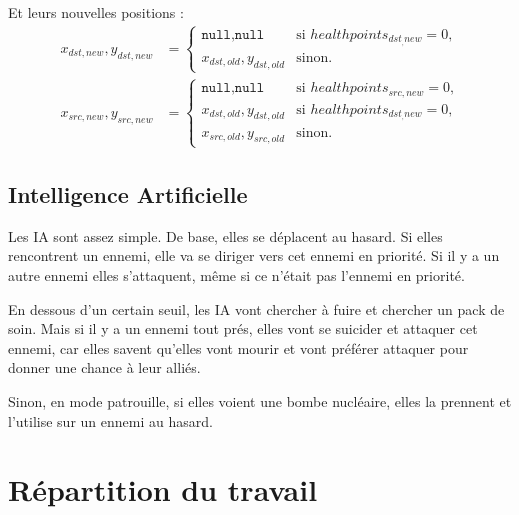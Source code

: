 \documentclass{article}
\begin{document}
Et leurs nouvelles positions : 
\begin{align}
     x_{dst,new},y_{dst,new} &=
     \begin{cases}
        \texttt{null},\texttt{null} & \text{si } healthpoints_{dst_,new} = 0 \text{,}\\
        x_{dst,old},y_{dst,old} & \text{sinon.} 
     \end{cases} \\
     x_{src,new},y_{src,new} &=
     \begin{cases}
        \texttt{null},\texttt{null} & \text{si } healthpoints_{src,new} = 0 \text{,}\\
        x_{dst,old},y_{dst,old} & \text{si } healthpoints_{dst_,new} = 0 \text{,}\\
        x_{src,old},y_{src,old} & \text{sinon.} 
     \end{cases}
\end{align}

\subsection{Intelligence Artificielle}
Les IA sont assez simple. De base, elles se déplacent au hasard.
Si elles rencontrent un ennemi, elle va se diriger vers cet ennemi en priorité. Si il y a un
autre ennemi elles s'attaquent, même si ce n'était pas l'ennemi en priorité.

En dessous d'un certain seuil, les IA vont chercher à fuire et chercher un pack de soin. Mais si il y a un ennemi
tout prés, elles vont se suicider et attaquer cet ennemi, car elles savent qu'elles vont mourir et vont préférer attaquer 
pour donner une chance à leur alliés.

Sinon, en mode patrouille, si elles voient une bombe nucléaire, elles la prennent et l'utilise sur un ennemi au hasard.
\section{Répartition du travail}
\end{document}
